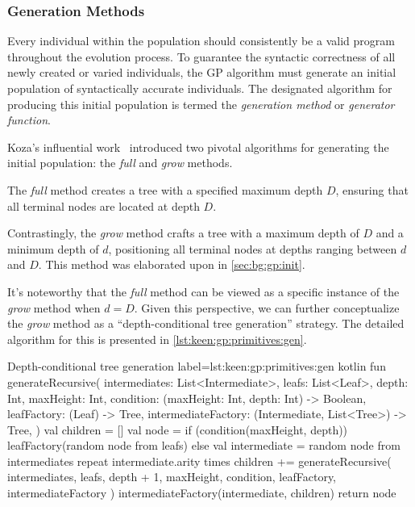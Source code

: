 
\subsubsection{Generation Methods}
\label{sec:keen:gp:primitives:gen}

  Every individual within the population should consistently be a valid program 
  throughout the evolution process. To guarantee the syntactic correctness of 
  all newly created or varied individuals, the GP algorithm must generate an 
  initial population of syntactically accurate individuals. The designated 
  algorithm for producing this initial population is termed the 
  \textit{generation method} or \textit{generator function}.

  Koza's influential work~\autocite{kozaGeneticProgrammingProgramming1992a} 
  introduced two pivotal algorithms for generating the initial population: the 
  \textit{full} and \textit{grow} methods.

  The \emph{full} method creates a tree with a specified maximum depth \(D\), 
  ensuring that all terminal nodes are located at depth \(D\).

  Contrastingly, the \emph{grow} method crafts a tree with a maximum depth of 
  \(D\) and a minimum depth of \(d\), positioning all terminal nodes at depths 
  ranging between \(d\) and \(D\). This method was elaborated upon in 
  \vref{sec:bg:gp:init}.

  It's noteworthy that the \emph{full} method can be viewed as a specific 
  instance of the \emph{grow} method when \(d = D\). Given this perspective, we 
  can further conceptualize the \emph{grow} method as a
  \enquote{depth-conditional tree generation} strategy. The detailed algorithm 
  for this is presented in \vref{lst:keen:gp:primitives:gen}.

  \begin{code}{Depth-conditional tree generation}{
    label=lst:keen:gp:primitives:gen
  }{kotlin}
    fun generateRecursive(
        intermediates: List<Intermediate>,
        leafs: List<Leaf>,
        depth: Int,
        maxHeight: Int,
        condition: (maxHeight: Int, depth: Int) -> Boolean,
        leafFactory: (Leaf) -> Tree,
        intermediateFactory: (Intermediate, List<Tree>) -> Tree,
    ) {
        val children = []
        val node = if (condition(maxHeight, depth)) {
            leafFactory(random node from leafs)
        } else {
            val intermediate = random node from intermediates
            repeat intermediate.arity times {
                children += generateRecursive(
                    intermediates,
                    leafs,
                    depth + 1,
                    maxHeight,
                    condition,
                    leafFactory,
                    intermediateFactory
                )
            }
            intermediateFactory(intermediate, children)
        }
        return node
    }
  \end{code}

